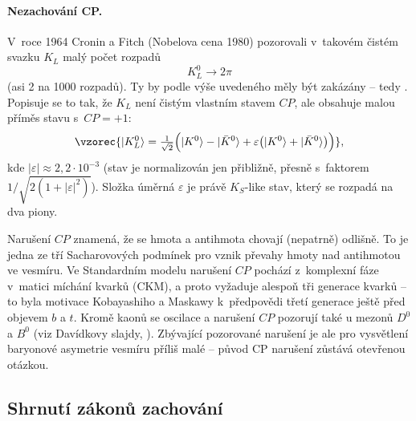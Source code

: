\paragraph{Nezachování CP.}
V~roce 1964 Cronin a Fitch (Nobelova cena 1980) pozorovali v~takovém čistém svazku $K_L$ malý počet rozpadů
\begin{equation}
  K^0_L \to 2\pi
\end{equation}
(asi 2 na 1000 rozpadů). Ty by podle výše uvedeného měly být zakázány -- tedy . Popisuje se to tak, že $K_L$ není čistým vlastním stavem $CP$, ale obsahuje malou příměs stavu s~$CP=+1$:
\begin{equation}
  \vzorec{|K^0_L\rangle = \tfrac{1}{\sqrt2}\Big(|K^0\rangle - |\bar K^0\rangle + \varepsilon\big(|K^0\rangle + |\bar K^0\rangle\big)\Big)},
\end{equation}
kde $|\varepsilon|\approx2{,}2\cdot10^{-3}$ (stav je normalizován jen přibližně, přesně s~faktorem $1/\sqrt{2(1+|\varepsilon|^2)}$). Složka úměrná $\varepsilon$ je právě $K_S$-like stav, který se rozpadá na dva piony.

\begin{vysvetleni}
  Narušení $CP$ znamená, že se hmota a antihmota chovají (nepatrně) odlišně. To je jedna ze tří Sacharovových podmínek pro vznik převahy hmoty nad antihmotou ve vesmíru. Ve Standardním modelu narušení $CP$ pochází z~komplexní fáze v~matici míchání kvarků (CKM), a proto vyžaduje alespoň tři generace kvarků -- to byla motivace Kobayashiho a Maskawy k~předpovědi třetí generace ještě před objevem $b$ a $t$. Kromě kaonů se oscilace a narušení $CP$ pozorují také u mezonů $D^0$ a $B^0$ (viz Davídkovy slajdy, ). Zbývající pozorované narušení je ale pro vysvětlení baryonové asymetrie vesmíru příliš malé -- původ CP narušení zůstává otevřenou otázkou.
\end{vysvetleni}

\subsection{Shrnutí zákonů zachování}

